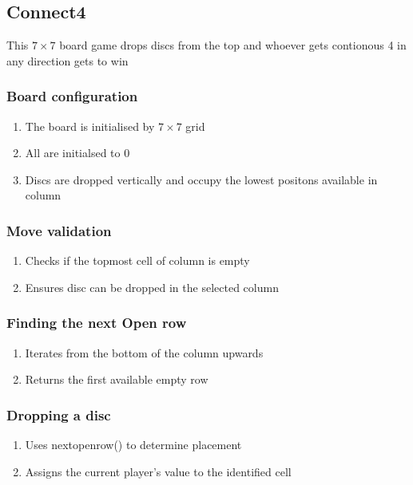 \documentclass{article}
\begin{document}
\subsection{Connect4}
This $7 \times 7$ board game drops discs from the top and whoever gets contionous 4 in any direction gets to win
\subsubsection{Board configuration}
\begin{enumerate}
    \item The board is initialised by $7 \times 7$ grid
    \item All are initialsed to 0
    \item Discs are dropped vertically and occupy the lowest positons available in column 
\end{enumerate}
\subsubsection{Move validation}
\begin{enumerate}
    \item Checks if the topmost cell of column is empty
    \item Ensures disc can be dropped in the selected column
\end{enumerate}
\subsubsection{Finding the next Open row}
\begin{enumerate}
    \item Iterates from the bottom of the column upwards
    \item Returns the first available empty row
\end{enumerate}
\subsubsection{Dropping a disc}
\begin{enumerate}
    \item Uses nextopenrow() to determine placement
    \item Assigns the current player's value to the identified cell
\end{enumerate}
\end{document}
